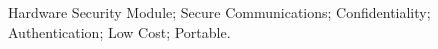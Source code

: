 \noindent Hardware Security Module; Secure Communications; Confidentiality; Authentication; Low Cost; Portable.
